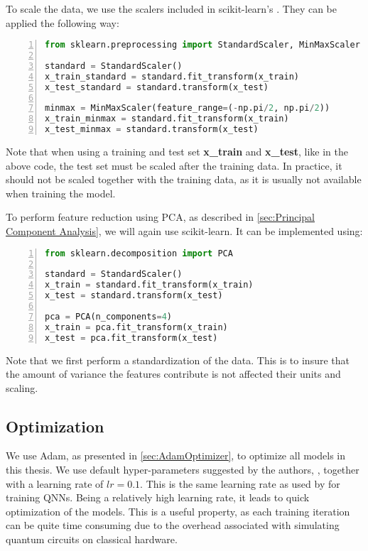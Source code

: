 To scale the data, we use the scalers included in scikit-learn's \cite{scikit-learn}. They can be applied the following way:
\begin{lstlisting}[language=python, numbers=left]
from sklearn.preprocessing import StandardScaler, MinMaxScaler

standard = StandardScaler()
x_train_standard = standard.fit_transform(x_train)
x_test_standard = standard.transform(x_test)

minmax = MinMaxScaler(feature_range=(-np.pi/2, np.pi/2))
x_train_minmax = standard.fit_transform(x_train)
x_test_minmax = standard.transform(x_test)
\end{lstlisting}
Note that when using a training and test set \textbf{x\_train} and \textbf{x\_test}, like in the above code, the test set must be scaled after the training data. In practice, it should not be scaled together with the training data, as it is usually not available when training the model.

To perform feature reduction using PCA, as described in \cref{sec:Principal Component Analysis}, we will again use scikit-learn. It can be implemented using:

\begin{lstlisting}[language=python, numbers=left]
from sklearn.decomposition import PCA

standard = StandardScaler()
x_train = standard.fit_transform(x_train)
x_test = standard.transform(x_test)

pca = PCA(n_components=4)
x_train = pca.fit_transform(x_train)
x_test = pca.fit_transform(x_test)
\end{lstlisting}
Note that we first perform a standardization of the data. This is to insure that the amount of variance the features contribute is not affected their units and scaling.


\subsection{Optimization}\label{sec:Optimization}
We use Adam, as presented in \cref{sec:AdamOptimizer}, to optimize all models in this thesis. We use default hyper-parameters suggested by the authors, \citet{kingma2017adam}, together with a learning rate of $lr=0.1$. This is the same learning rate as used by \citet{abbas2020power} for training QNNs. Being a relatively high learning rate, it leads to quick optimization of the models. This is a useful property, as each training iteration can be quite time consuming due to the overhead associated with simulating quantum circuits on classical hardware.

